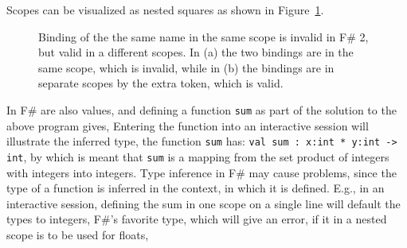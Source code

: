 %
Scopes can be visualized as nested squares as shown in Figure~\ref{fig:scope}.
\begin{figure}
  \centering
  \caption{Binding of the the same name in the same scope is invalid in F\# 2, but valid in a different scopes. In (a) the two bindings are in the same scope, which is invalid, while in (b) the bindings are in separate scopes by the extra \token{;;} token, which is valid.}
  \label{fig:scope}
\end{figure}

In F\#  are also values, and defining a function \lstinline|sum| as part of the solution to the above program gives,
%
%
Entering the function into an interactive session will illustrate the inferred type, the function \lstinline|sum| has: \lstinline{val sum : x:int * y:int -> int}, by which is meant that \lstinline|sum| is a mapping from the set product of integers with integers into integers. Type inference in F\# may cause problems, since the type of a function is inferred in the context, in which it is defined. E.g., in an interactive session, defining the sum in one scope on a single line will default the types to integers, F\#'s favorite type, which will give an error, if it in a nested scope is to be used for floats,
%




